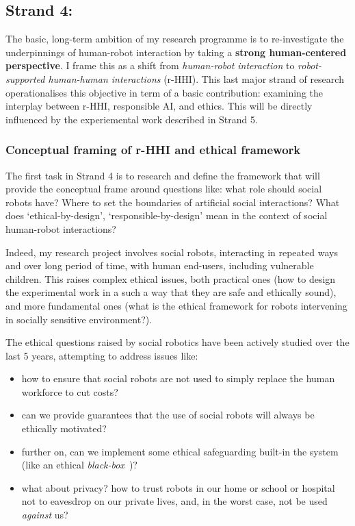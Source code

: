 \subsection{Strand 4: \textbf{\wpOne}}

The basic, long-term ambition of my research programme is to re-investigate the
underpinnings of human-robot interaction by taking a \textbf{strong
human-centered perspective}. I frame this as a shift from \emph{human-robot
interaction} to \emph{robot-supported human-human interactions} (r-HHI). This
last major strand of research operationalises this objective in term of a basic
contribution: examining the interplay between r-HHI, responsible
AI, and ethics. This will be directly influenced by the experiemental work
described in Strand 5.

\subsubsection{Conceptual framing of r-HHI and ethical framework} 

The first task in Strand 4 is to research and define the framework that will provide
the conceptual frame around questions like: what role should social robots have?
Where to set the boundaries of artificial social interactions? What does
`ethical-by-design', `responsible-by-design' mean in the context of social
human-robot interactions?

Indeed, my research project involves social robots, interacting in repeated ways and
over long period of time, with human end-users, including vulnerable children.
This raises complex ethical issues, both practical ones (how to design the
experimental work in a such a way that they are safe and ethically sound), and
more fundamental ones (what is the ethical framework for robots intervening in
socially sensitive environment?).

The ethical questions raised by social robotics have been actively studied over
the last 5 years, attempting to address issues like:

\begin{itemize}
    \item how to ensure that social robots are not used to simply replace the human
        workforce to cut costs?
    \item can we provide guarantees that the use of social robots will always be
        ethically motivated?
    \item further on, can we implement some ethical safeguarding built-in
        the system (like an ethical \emph{black-box}~\parencite{winfield2017case})?
    \item what about privacy? how to trust robots in our home or school or
        hospital not to eavesdrop on our private lives, and, in the worst
        case, not be used \emph{against} us?
\end{itemize}

